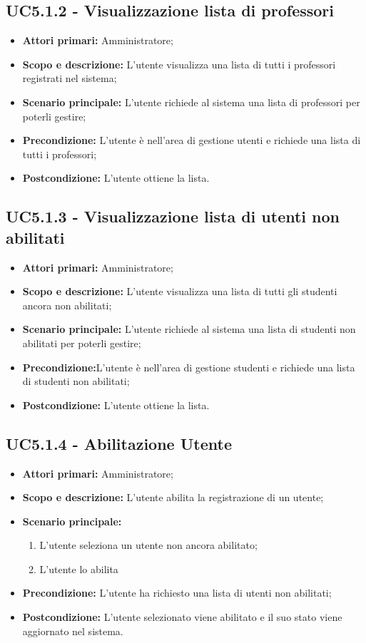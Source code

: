 \documentclass[AnalisiDeiRequisiti.tex]{subfiles}
\begin{document}
\subsection{UC5.1.2 - Visualizzazione lista di professori}
\begin{itemize}
	\item \textbf{Attori primari:} Amministratore;
	\item \textbf{Scopo e descrizione:} L'utente visualizza una lista di tutti i professori registrati nel sistema;
	\item \textbf{Scenario principale:} L'utente richiede al sistema una lista di professori per poterli gestire;
	\item \textbf{Precondizione:} L'utente è nell'area di gestione utenti e richiede una lista di tutti i professori; 
	\item \textbf{Postcondizione:} L'utente ottiene la lista.
\end{itemize}
\subsection{UC5.1.3 - Visualizzazione lista di utenti non abilitati}
\begin{itemize}
	\item \textbf{Attori primari:} Amministratore;
	\item \textbf{Scopo e descrizione:} L'utente visualizza una lista di tutti gli studenti ancora non abilitati;
	\item \textbf{Scenario principale:} L'utente richiede al sistema una lista di studenti non abilitati per poterli gestire;
	\item \textbf{Precondizione:}L'utente è nell'area di gestione studenti e richiede una lista di studenti non abilitati; 
	\item \textbf{Postcondizione:} L'utente ottiene la lista.
\end{itemize}
\subsection{UC5.1.4 - Abilitazione Utente}
\begin{itemize}
	\item \textbf{Attori primari:} Amministratore;
	\item \textbf{Scopo e descrizione:} L'utente abilita la registrazione di un utente;
	\item \textbf{Scenario principale:}
	\begin{enumerate}
		\item L'utente seleziona un utente non ancora abilitato;
		\item L'utente lo abilita
	\end{enumerate}
	\item \textbf{Precondizione:} L'utente ha richiesto una lista di utenti non abilitati; 
	\item \textbf{Postcondizione:} L'utente selezionato viene abilitato e il suo stato viene aggiornato nel sistema.
\end{itemize}
\end{document}
